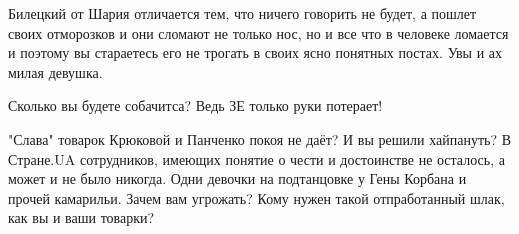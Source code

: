 \begin{itemize}
Билецкий от Шария отличается тем, что ничего говорить не будет, а пошлет своих
отморозков и они сломают не только нос, но и все что в человеке ломается и
поэтому вы стараетесь его не трогать в своих ясно понятных постах. Увы и ах
милая девушка.


 
Сколько вы будете собачитса? Ведь ЗЕ только руки потерает!

 

"Слава" товарок Крюковой и Панченко покоя не даёт? И вы решили хайпануть? \Laughey[1.0][white] В
Стране.UA сотрудников, имеющих понятие о чести и достоинстве не осталось, а
может и не было никогда. Одни девочки на подтанцовке у Гены Корбана и прочей
камарильи. Зачем вам угрожать? Кому нужен такой отпработанный шлак, как вы и
ваши товарки?

\end{itemize}

